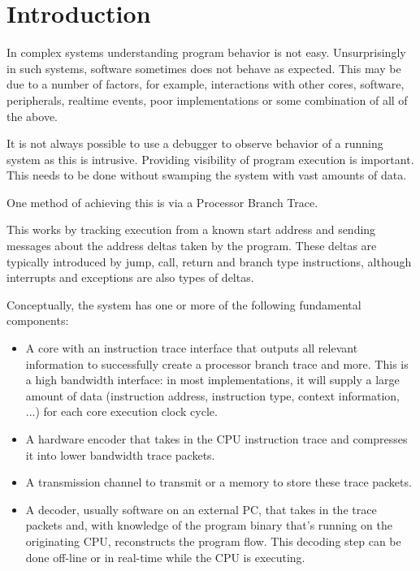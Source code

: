 \chapter{Introduction}
\label{sec:intro}

In complex systems understanding program behavior is not easy.
Unsurprisingly in such systems, software sometimes does not behave as
expected. This may be due to a number of factors, for example,
interactions with other cores, software, peripherals, realtime
events, poor implementations or some combination of all of the above.

It is not always possible to use a debugger to observe behavior of a
running system as this is intrusive.  Providing visibility of program
execution is important.  This needs to be done without swamping the
system with vast amounts of data.

One method of achieving this is via a Processor Branch Trace.

This works by tracking execution from a known start address and sending
messages about the address deltas taken by the program. These deltas are
typically introduced by jump, call, return and branch type instructions,
although interrupts and exceptions are also types of deltas.

Conceptually, the system has one or more of the following fundamental components:

\begin{itemize}
  \item
    A core with an instruction trace interface that outputs all relevant
    information to successfully create a processor branch trace and more.
    This is a high bandwidth interface: in most implementations, it will supply
    a large amount of data (instruction address, instruction type, context information, ...)
    for each core execution clock cycle.
  \item
    A hardware encoder that takes in the CPU instruction trace and compresses
    it into lower bandwidth trace packets.
  \item
    A transmission channel to transmit or a memory to store these trace packets.
  \item
    A decoder, usually software on an external PC, that takes in the trace
    packets and, with knowledge of the program binary that's running on the
    originating CPU, reconstructs the program flow. This decoding step can
    be done off-line or in real-time while the CPU is executing.
\end{itemize}

